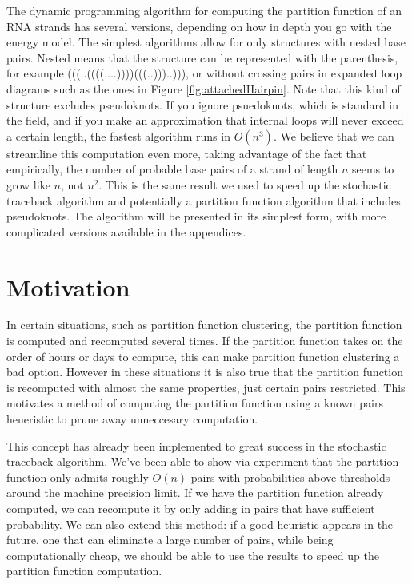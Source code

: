 The dynamic programming algorithm for computing the partition function
of an RNA strands has several versions, depending on how in depth you
go with the energy model. The simplest algorithms allow for only
structures with nested base pairs. Nested means that the structure can
be represented with the parenthesis, for example
(((..((((....))))(((..)))..))), or without crossing pairs in expanded
loop diagrams such as the ones in Figure
\ref{fig:attachedHairpin}. Note that this kind of structure excludes
pseudoknots.  If you ignore psuedoknots, which is standard in the
field, and if you make an approximation that internal loops will never
exceed a certain length, the fastest algorithm runs in $O(n^3)$. We
believe that we can streamline this computation even more, taking
advantage of the fact that empirically, the number of probable base
pairs of a strand of length $n$ seems to grow like $n$, not
$n^2$. This is the same result we used to speed up the stochastic
traceback algorithm and potentially a partition function algorithm
that includes pseudoknots. The algorithm will be presented in its
simplest form, with more complicated versions available in the
appendices.

\section{Motivation}

In certain situations, such as partition function clustering, the
partition function is computed and recomputed several times. If the
partition function takes on the order of hours or days to compute,
this can make partition function clustering a bad option. However in
these situations it is also true that the partition function is
recomputed with almost the same properties, just certain pairs
restricted. This motivates a method of computing the partition
function using a known pairs heueristic to prune away unneccesary
computation.

This concept has already been implemented to great success in the
stochastic traceback algorithm. We've been able to show via experiment
that the partition function only admits roughly $O(n)$ pairs with
probabilities above thresholds around the machine precision limit. If
we have the partition function already computed, we can recompute it
by only adding in pairs that have sufficient probability. We can also
extend this method: if a good heuristic appears in the future, one
that can eliminate a large number of pairs, while being
computationally cheap, we should be able to use the results to speed
up the partition function computation.

